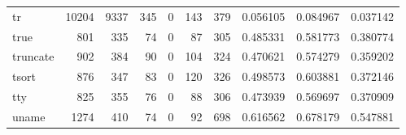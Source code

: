 \begin{tabular}{lrrrrrrrrr}
tr        &                               10204 &                                            9337 &                                            345 &                                             0 &                                            143 &                                          379 &                                           0.056105 &                               0.084967 &                             0.037142 \\
true      &                                 801 &                                             335 &                                             74 &                                             0 &                                             87 &                                          305 &                                           0.485331 &                               0.581773 &                             0.380774 \\
truncate  &                                 902 &                                             384 &                                             90 &                                             0 &                                            104 &                                          324 &                                           0.470621 &                               0.574279 &                             0.359202 \\
tsort     &                                 876 &                                             347 &                                             83 &                                             0 &                                            120 &                                          326 &                                           0.498573 &                               0.603881 &                             0.372146 \\
tty       &                                 825 &                                             355 &                                             76 &                                             0 &                                             88 &                                          306 &                                           0.473939 &                               0.569697 &                             0.370909 \\
uname     &                                1274 &                                             410 &                                             74 &                                             0 &                                             92 &                                          698 &                                           0.616562 &                               0.678179 &                             0.547881 \\

\end{tabular}
